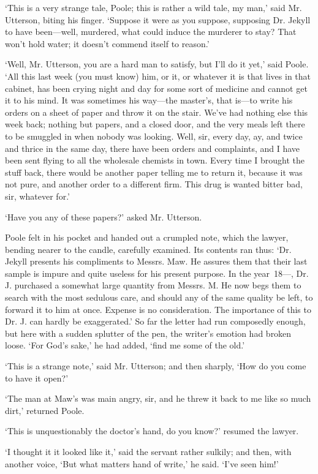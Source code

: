 \documentclass[]{novel}
\begin{document}
‘This is a very strange tale, Poole; this is rather a wild tale, my man,’ said Mr. Utterson, biting his finger. ‘Suppose it were as you suppose, supposing Dr. Jekyll to have been—well, murdered, what could induce the murderer to stay? That won’t hold water; it doesn’t commend itself to reason.’

‘Well, Mr. Utterson, you are a hard man to satisfy, but I’ll do it yet,’ said Poole. ‘All this last week (you must know) him, or it, or whatever it is that lives in that cabinet, has been crying night and day for some sort of medicine and cannot get it to his mind. It was sometimes his way—the master’s, that is—to write his orders on a sheet of paper and throw it on the stair. We’ve had nothing else this week back; nothing but papers, and a closed door, and the very meals left there to be smuggled in when nobody was looking. Well, sir, every day, ay, and twice and thrice in the same day, there have been orders and complaints, and I have been sent flying to all the wholesale chemists in town. Every time I brought the stuff back, there would be another paper telling me to return it, because it was not pure, and another order to a different firm. This drug is wanted bitter bad, sir, whatever for.’

‘Have you any of these papers?’ asked Mr. Utterson.

Poole felt in his pocket and handed out a crumpled note, which the lawyer, bending nearer to the candle, carefully examined. Its contents ran thus: ‘Dr. Jekyll presents his compliments to Messrs. Maw. He assures them that their last sample is impure and quite useless for his present purpose. In the year~18—, Dr. J. purchased a somewhat large quantity from Messrs. M. He now begs them to search with the most sedulous care, and should any of the same quality be left, to forward it to him at once. Expense is no consideration. The importance of this to Dr. J. can hardly be exaggerated.’ So far the letter had run composedly enough, but here with a sudden splutter of the pen, the writer’s emotion had broken loose. ‘For God’s sake,’ he had added, ‘find me some of the old.’

‘This is a strange note,’ said Mr. Utterson; and then sharply, ‘How do you come to have it open?’

‘The man at Maw’s was main angry, sir, and he threw it back to me like so much dirt,’ returned Poole.

‘This is unquestionably the doctor’s hand, do you know?’ resumed the lawyer.

‘I thought it it looked like it,’ said the servant rather sulkily; and then, with another voice, ‘But what matters hand of write,’ he said. ‘I’ve seen him!’
\end{document}
